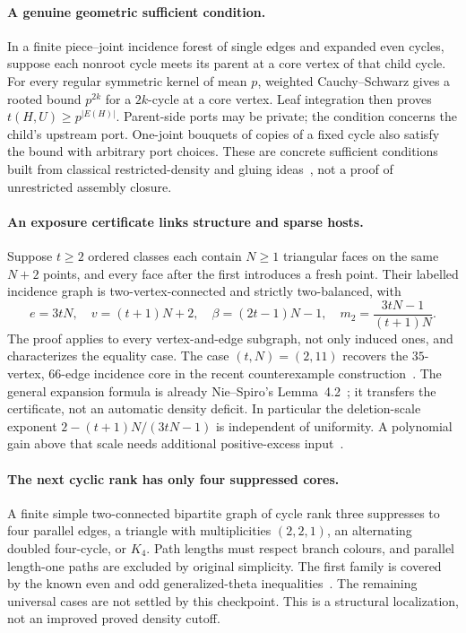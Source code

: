 \paragraph{A genuine geometric sufficient condition.}
In a finite piece--joint incidence forest of single edges and expanded
even cycles, suppose each nonroot cycle meets its parent at a core
vertex of that child cycle.  For every regular symmetric kernel of mean
$p$, weighted Cauchy--Schwarz gives a rooted bound $p^{2k}$ for a
$2k$-cycle at a core vertex.  Leaf integration then proves
$t(H,U)\ge p^{|E(H)|}$.  Parent-side ports may be private; the condition
concerns the child's upstream port.  One-joint bouquets of copies of
a fixed cycle also satisfy the bound with arbitrary port choices.
These are concrete sufficient conditions built from classical
restricted-density and gluing ideas~\citep{liszegedy2011,szegedy2014},
not a proof of unrestricted assembly closure.

\paragraph{An exposure certificate links structure and sparse hosts.}
Suppose $t\ge2$ ordered classes each contain $N\ge1$ triangular faces
on the same $N+2$ points, and every face after the first introduces a
fresh point.  Their labelled incidence graph is two-vertex-connected
and strictly two-balanced, with
\[
 e=3tN,\quad v=(t+1)N+2,\quad
 \beta=(2t-1)N-1,\quad m_2=\frac{3tN-1}{(t+1)N}.
\]
The proof applies to every vertex-and-edge subgraph, not only induced
ones, and characterizes the equality case.  The case $(t,N)=(2,11)$
recovers the $35$-vertex, $66$-edge incidence core in the recent
counterexample construction~\citep{openai161}.  The general expansion
formula is already Nie--Spiro's Lemma~4.2~\citep{niespiro_expansions2024};
it transfers the certificate, not an automatic density deficit.  In
particular the deletion-scale exponent
$2-(t+1)N/(3tN-1)$ is independent of uniformity.  A polynomial gain
above that scale needs additional positive-excess input~\citep{niespiro2025}.

\paragraph{The next cyclic rank has only four suppressed cores.}
A finite simple two-connected bipartite graph of cycle rank three
suppresses to four parallel edges, a triangle with multiplicities
$(2,2,1)$, an alternating doubled four-cycle, or $K_4$.
Path lengths must respect branch colours, and parallel length-one
paths are excluded by original simplicity.  The first family is
covered by the known even and odd generalized-theta
inequalities~\citep{imliliu2024}.  The remaining universal cases are
not settled by this checkpoint.  This is a structural localization,
not an improved proved density cutoff.


